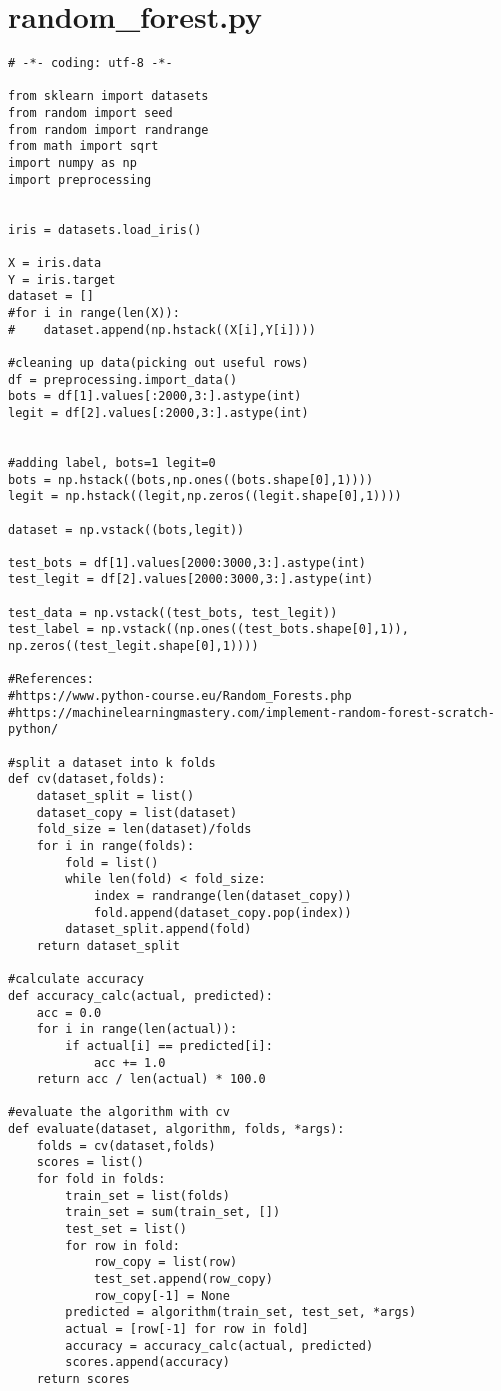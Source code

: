 \section{random\_forest.py}
\begin{lstlisting}
# -*- coding: utf-8 -*-

from sklearn import datasets
from random import seed
from random import randrange
from math import sqrt
import numpy as np
import preprocessing


iris = datasets.load_iris()

X = iris.data
Y = iris.target
dataset = []
#for i in range(len(X)):
#    dataset.append(np.hstack((X[i],Y[i])))

#cleaning up data(picking out useful rows)
df = preprocessing.import_data()
bots = df[1].values[:2000,3:].astype(int)
legit = df[2].values[:2000,3:].astype(int)


#adding label, bots=1 legit=0
bots = np.hstack((bots,np.ones((bots.shape[0],1))))
legit = np.hstack((legit,np.zeros((legit.shape[0],1))))

dataset = np.vstack((bots,legit))

test_bots = df[1].values[2000:3000,3:].astype(int)
test_legit = df[2].values[2000:3000,3:].astype(int)

test_data = np.vstack((test_bots, test_legit))
test_label = np.vstack((np.ones((test_bots.shape[0],1)), np.zeros((test_legit.shape[0],1))))

#References:
#https://www.python-course.eu/Random_Forests.php
#https://machinelearningmastery.com/implement-random-forest-scratch-python/

#split a dataset into k folds
def cv(dataset,folds):
    dataset_split = list()
    dataset_copy = list(dataset)
    fold_size = len(dataset)/folds
    for i in range(folds):
        fold = list()
        while len(fold) < fold_size:
            index = randrange(len(dataset_copy))
            fold.append(dataset_copy.pop(index))
        dataset_split.append(fold)
    return dataset_split

#calculate accuracy
def accuracy_calc(actual, predicted):
    acc = 0.0
    for i in range(len(actual)):
        if actual[i] == predicted[i]:
            acc += 1.0
    return acc / len(actual) * 100.0

#evaluate the algorithm with cv
def evaluate(dataset, algorithm, folds, *args):
    folds = cv(dataset,folds)
    scores = list()
    for fold in folds:
        train_set = list(folds)
        train_set = sum(train_set, [])
        test_set = list()
        for row in fold:
            row_copy = list(row)
            test_set.append(row_copy)
            row_copy[-1] = None
        predicted = algorithm(train_set, test_set, *args)
        actual = [row[-1] for row in fold]
        accuracy = accuracy_calc(actual, predicted)
        scores.append(accuracy)
    return scores



\end{lstlisting}
